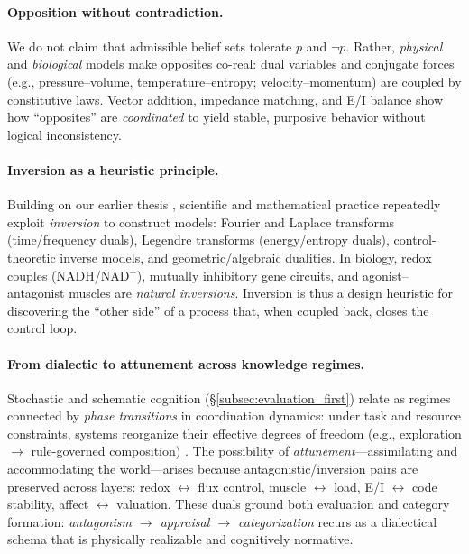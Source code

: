 \paragraph{Opposition without contradiction.}
We do not claim that admissible belief sets tolerate $p$ and $\neg p$. Rather, \emph{physical} and \emph{biological} models make opposites co-real: dual variables and conjugate forces (e.g., pressure--volume, temperature--entropy; velocity--momentum) are coupled by constitutive laws. Vector addition, impedance matching, and E/I balance show how “opposites” are \emph{coordinated} to yield stable, purposive behavior without logical inconsistency.

\paragraph{Inversion as a heuristic principle.}
Building on our earlier thesis \citep{Nagarjuna2004_LogicInversion}, scientific and mathematical practice repeatedly exploit \emph{inversion} to construct models: Fourier and Laplace transforms (time/frequency duals), Legendre transforms (energy/entropy duals), control-theoretic inverse models, and geometric/algebraic dualities. In biology, redox couples (NADH/NAD$^+$), mutually inhibitory gene circuits, and agonist--antagonist muscles are \emph{natural inversions}. Inversion is thus a design heuristic for discovering the “other side” of a process that, when coupled back, closes the control loop.

\paragraph{From dialectic to attunement across knowledge regimes.}
Stochastic and schematic cognition (\S\ref{subsec:evaluation_first}) relate as regimes connected by \emph{phase transitions} in coordination dynamics: under task and resource constraints, systems reorganize their effective degrees of freedom (e.g., exploration $\to$ rule-governed composition) \citep{Haken1983_Synergetics,Kelso1995_DynamicPatterns}. The possibility of \emph{attunement}—assimilating and accommodating the world—arises because antagonistic/inversion pairs are preserved across layers: redox $\leftrightarrow$ flux control, muscle $\leftrightarrow$ load, E/I $\leftrightarrow$ code stability, affect $\leftrightarrow$ valuation. These duals ground both evaluation and category formation: \emph{antagonism $\to$ appraisal $\to$ categorization} recurs as a dialectical schema that is physically realizable and cognitively normative.

